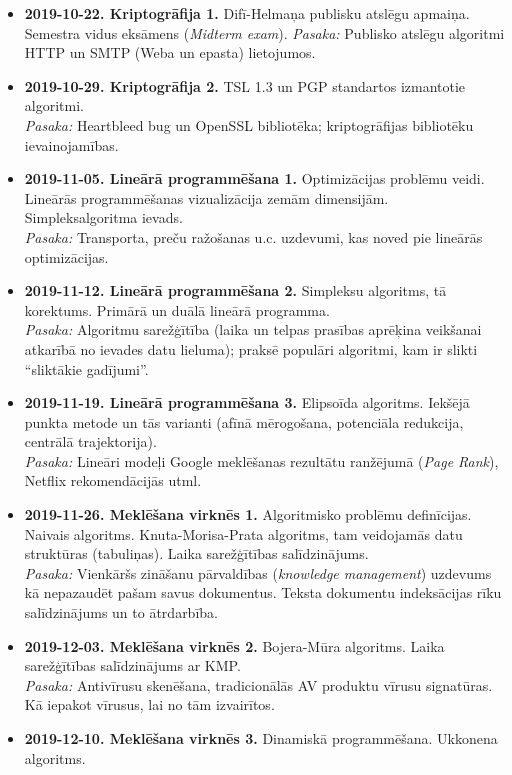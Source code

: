 \documentclass[11pt]{article}
\begin{document}
\begin{itemize}
\item {\bf 2019-10-22. Kriptogrāfija \textendash{} 1.} 
Difī-Helmaņa publisku atslēgu apmaiņa. Semestra vidus eksāmens ({\em Midterm exam}).
{\em Pasaka:} Publisko atslēgu algoritmi HTTP un SMTP (Weba un epasta) lietojumos.
\item {\bf 2019-10-29. Kriptogrāfija \textendash{} 2.} TSL 1.3 un PGP standartos izmantotie algoritmi.\\
{\em Pasaka:} Heartbleed bug un OpenSSL bibliotēka; kriptogrāfijas bibliotēku ievainojamības.
\item {\bf 2019-11-05. Lineārā programmēšana \textendash{} 1.} Optimizācijas problēmu veidi. 
Lineārās programmēšanas vizualizācija zemām dimensijām. Simpleksalgoritma ievads.\\
{\em Pasaka:} 
Transporta, preču ražošanas u.c. uzdevumi, kas noved pie lineārās optimizācijas.
\item {\bf 2019-11-12. Lineārā programmēšana \textendash{} 2.} Simpleksu algoritms, tā korektums. 
Primārā un duālā lineārā programma.\\
{\em Pasaka:} Algoritmu sarežģītība (laika un telpas prasības aprēķina veikšanai atkarībā 
no ievades datu lieluma); praksē populāri algoritmi, kam ir slikti “sliktākie gadījumi”.
\item {\bf 2019-11-19. Lineārā programmēšana \textendash{} 3.} Elipsoīda algoritms. Iekšējā punkta metode un tās varianti 
(afīnā mērogošana, potenciāla redukcija, centrālā trajektorija).\\
{\em Pasaka:} Lineāri modeļi Google meklēšanas rezultātu ranžējumā ({\em Page Rank}), 
Netflix rekomendācijās utml.
\item {\bf 2019-11-26. Meklēšana virknēs \textendash{} 1.} 
Algoritmisko problēmu definīcijas. Naivais algoritms. Knuta-Morisa-Prata algoritms, 
tam veidojamās datu struktūras (tabuliņas). Laika sarežģītības salīdzinājums.\\
{\em Pasaka:} Vienkāršs zināšanu pārvaldības ({\em knowledge management}) uzdevums \textendash{} 
kā nepazaudēt pašam savus dokumentus. Teksta dokumentu indeksācijas rīku salīdzinājums un to ātrdarbība.
\item {\bf 2019-12-03. Meklēšana virknēs \textendash{} 2.} 
Bojera-Mūra algoritms. Laika sarežģītības salīdzinājums ar KMP.\\
{\em Pasaka:} Antivīrusu skenēšana, tradicionālās AV produktu vīrusu signatūras. 
Kā iepakot vīrusus, lai no tām izvairītos.
\item {\bf 2019-12-10. Meklēšana virknēs \textendash{} 3.} Dinamiskā programmēšana. Ukkonena algoritms. 

\end{itemize}
\end{document}

